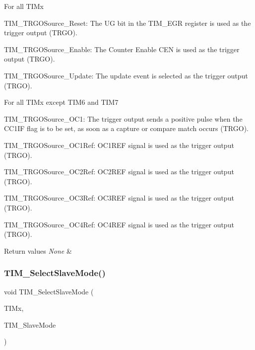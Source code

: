 \begin{DoxyItemize}
\item For all T\+I\+Mx \begin{DoxyItemize}
\item T\+I\+M\+\_\+\+T\+R\+G\+O\+Source\+\_\+\+Reset\+: The UG bit in the T\+I\+M\+\_\+\+E\+GR register is used as the trigger output (T\+R\+GO). \item T\+I\+M\+\_\+\+T\+R\+G\+O\+Source\+\_\+\+Enable\+: The Counter Enable C\+EN is used as the trigger output (T\+R\+GO). \item T\+I\+M\+\_\+\+T\+R\+G\+O\+Source\+\_\+\+Update\+: The update event is selected as the trigger output (T\+R\+GO).\end{DoxyItemize}

\item For all T\+I\+Mx except T\+I\+M6 and T\+I\+M7 \begin{DoxyItemize}
\item T\+I\+M\+\_\+\+T\+R\+G\+O\+Source\+\_\+\+O\+C1\+: The trigger output sends a positive pulse when the C\+C1\+IF flag is to be set, as soon as a capture or compare match occurs (T\+R\+GO). \item T\+I\+M\+\_\+\+T\+R\+G\+O\+Source\+\_\+\+O\+C1\+Ref\+: O\+C1\+R\+EF signal is used as the trigger output (T\+R\+GO). \item T\+I\+M\+\_\+\+T\+R\+G\+O\+Source\+\_\+\+O\+C2\+Ref\+: O\+C2\+R\+EF signal is used as the trigger output (T\+R\+GO). \item T\+I\+M\+\_\+\+T\+R\+G\+O\+Source\+\_\+\+O\+C3\+Ref\+: O\+C3\+R\+EF signal is used as the trigger output (T\+R\+GO). \item T\+I\+M\+\_\+\+T\+R\+G\+O\+Source\+\_\+\+O\+C4\+Ref\+: O\+C4\+R\+EF signal is used as the trigger output (T\+R\+GO).\end{DoxyItemize}

\begin{DoxyRetVals}{Return values}
{\em None} & \\
\hline
\end{DoxyRetVals}

\end{DoxyItemize}\mbox{\label{group___t_i_m___private___functions_ga2f19ce1d90990691cf037e419ba08003}} 
\subsubsection{\texorpdfstring{TIM\_SelectSlaveMode()}{TIM\_SelectSlaveMode()}}
{\footnotesize\ttfamily void T\+I\+M\+\_\+\+Select\+Slave\+Mode (\begin{DoxyParamCaption}\item[{\mbox{\hyperlink{struct_t_i_m___type_def}{T\+I\+M\+\_\+\+Type\+Def}} $\ast$}]{T\+I\+Mx,  }\item[{uint16\+\_\+t}]{T\+I\+M\+\_\+\+Slave\+Mode }\end{DoxyParamCaption})}



